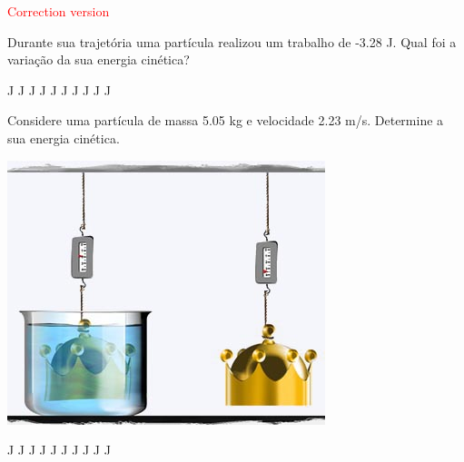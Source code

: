 \documentclass[12pt, addpoints]{exam}
\begin{document}
\begin{center}
\textcolor{red}{\emph\Large Correction version}\end{center}
\begin{questions}
\begin{multicols}{2}
\question[33] 
            Durante sua trajetória uma partícula realizou um trabalho de   -3.28 J. Qual foi a variação da sua energia cinética?
        

\begin{oneparchoices}
 J J J J J J J J J J\end{oneparchoices}

\begin{oneparchoices}
\end{oneparchoices}
\question[23] 
            Considere uma partícula de massa    5.05 kg e velocidade    2.23 m/s. Determine a sua energia cinética.
        

\begin{center}
\begin{minipage}[c]{0.75\linewidth}
\includegraphics[width=\textwidth]{MWE001.jpg}
\end{minipage}

\end{center}
\begin{oneparchoices}
 J J J J J J J J J J\end{oneparchoices}

\begin{oneparchoices}
\end{oneparchoices}
\end{multicols}
\end{questions}
\end{document}
